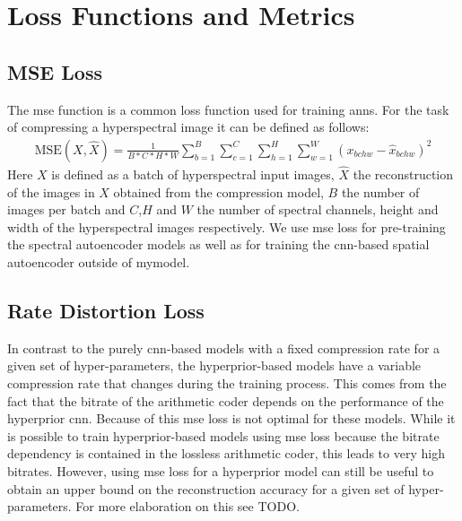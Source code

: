 \section{Loss Functions and Metrics}

\subsection{MSE Loss}
The \ac{mse} function is a common loss function used for training \acp{ann}. For the task of compressing a hyperspectral image it can be defined as follows:
\begin{align}
\text{MSE}(X,\hat{X}) = \frac{1}{B*C*H*W} \sum_{b=1}^{B}\sum_{c=1}^{C}\sum_{h=1}^H\sum_{w=1}^W (x_{bchw} - \hat{x}_{bchw})^2
\end{align}
Here $X$ is defined as a batch of hyperspectral input images, $\hat{X}$ the reconstruction of the images in $X$ obtained from the compression model, $B$ the number of images per batch and $C$,$H$ and $W$ the number of spectral channels, height and width of the hyperspectral images respectively.
We use \ac{mse} loss for pre-training the spectral autoencoder models as well as for training the \ac{cnn}-based spatial autoencoder outside of \ac{mymodel}.

\subsection{Rate Distortion Loss\label{sec:ch5ratedistortion}}
In contrast to the purely \ac{cnn}-based models with a fixed compression rate for a given set of hyper-parameters, the hyperprior-based models have a variable compression rate that changes during the training process. This comes from the fact that the bitrate of the arithmetic coder depends on the performance of the hyperprior \ac{cnn}. Because of this \ac{mse} loss is not optimal for these models. While it is possible to train hyperprior-based models using \ac{mse} loss because the bitrate dependency is contained in the lossless arithmetic coder, this leads to very high bitrates. However, using \ac{mse} loss for a hyperprior model can still be useful to obtain an upper bound on the reconstruction accuracy for a given set of hyper-parameters. For more elaboration on this see TODO.

